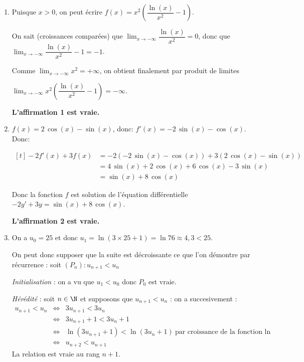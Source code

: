 \smallskip

\begin{enumerate}
\item Puisque $x > 0$, on peut écrire $f(x) = x^2\left(\dfrac{\ln (x)}{x^2}  - 1\right)$.

On sait (croissances comparées) que $\displaystyle\lim_{x \to - \infty} \dfrac{\ln (x)}{x^2} = 0$, donc que $\displaystyle\lim_{x \to - \infty} \dfrac{\ln (x)}{x^2} - 1 = - 1$.

Comme $\displaystyle\lim_{x \to - \infty}x^2 = + \infty$, on obtient finalement par produit de limites 

$\displaystyle\lim_{x \to - \infty} x^2 \left(\dfrac{\ln (x)}{x^2}  - 1\right) = - \infty$.

\hfill\textbf{L'affirmation 1 est vraie.}

\item $f(x)=2\,\cos\left (x\right )- \sin\left (x\right )$, donc:
$f'(x)= -2\,\sin\left (x\right ) - \cos\left (x\right )$. Donc:

$\begin{aligned}[t]
- 2f'(x) + 3f(x) 
& = -2\left ( -2\,\sin\left (x\right ) - \cos\left (x\right )\right ) +3 \left (2\,\cos\left (x\right )- \sin\left (x\right ) \right )\\
& = 4\,\sin\left (x\right ) +2\,\cos\left (x\right ) +6\,\cos\left (x\right ) -3\,\sin\left (x\right )\\
 & = \sin\left (x\right ) +8\,\cos\left (x\right )
\end{aligned}$

Donc la fonction $f$ est solution de l'équation différentielle $-2y' +3y =  \sin\left (x\right ) +8\,\cos\left (x\right )$.

\hfill\textbf{L'affirmation 2 est vraie.}

\item On a $u_0 = 25$ et donc $u_1 = \ln (3 \times 25 + 1) = \ln 76 \approx 4,3 < 25$.

On peut donc supposer que la suite est décroissante ce que l'on démontre par récurrence : soit $(P_n) : u_{n+1} < u_n$

\textit{Initialisation} : on a vu que $u_1 < u_0$ donc $P_0$ est vraie.

\textit{Hérédité} : soit $n \in \N$ et supposons que $u_{n+1} < u_n$ : on a succesivement :
\begin{eqnarray*}
u_{n+1} < u_n &\iff & 3u_{n+1} < 3u_n\\
&\iff &3u_{n+1} + 1 < 3u_n + 1\\
&\iff &\ln \left(3u_{n+1} + 1\right) < \ln \left(3u_n + 1\right)\:\text{par croissance de la fonction ln}\\
&\iff &u_{n+2} < u_{n+1}
\end{eqnarray*}
La relation est vraie au rang $n+1$.


\end{enumerate}
